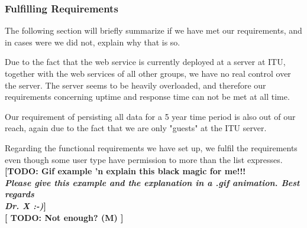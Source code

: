 \subsubsection{Fulfilling Requirements}
The following section will briefly summarize if we have met our requirements, and in cases were we did not, explain why that is so.

Due to the fact that the web service is currently deployed at a server at ITU, together with the web services of all other groups, we have no real control over the server. The server seems to be heavily overloaded, and therefore our requirements concerning uptime and response time can not be met at all time.

Our requirement of persisting all data for a 5 year time period is also out of our reach, again due to the fact that we are only "guests" at the ITU server.

Regarding the functional requirements we have set up, we fulfil the requirements even though some user type have permission to more than the list expresses.
\textbf{[TODO: Gif example 'n explain this black magic for me!!! \\\textit{Please give this example and the explanation in a .gif animation. Best regards\\Dr. X :-)}]}\\
\textbf{[ TODO: Not enough? (M) ]}